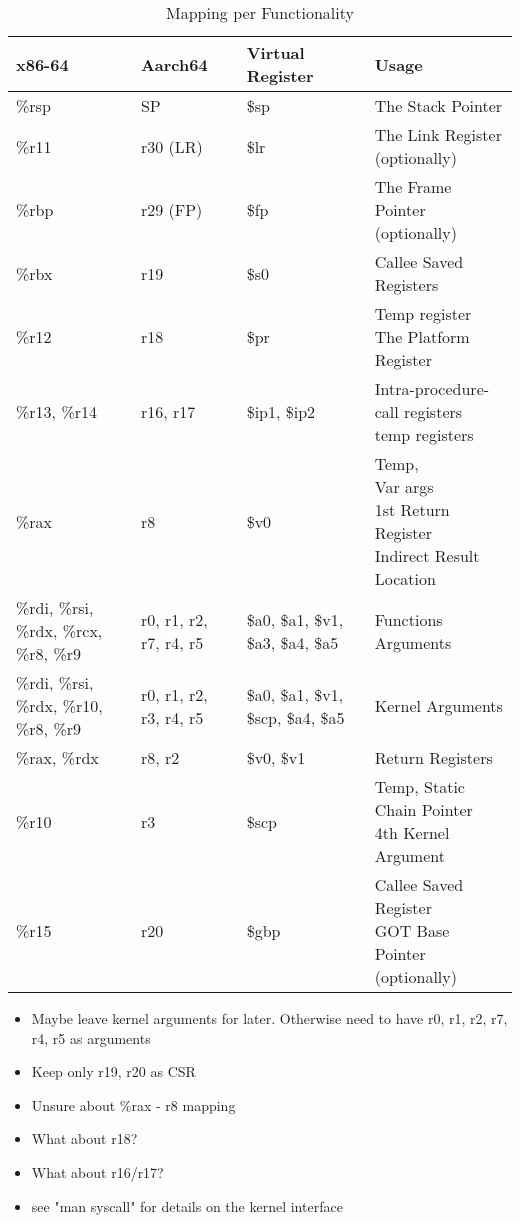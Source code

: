 \documentclass[11pt]{article}
\begin{document}
\begin{table}[ht]
\caption{Mapping per Functionality}
\begin{adjustwidth}{-4.3cm}{-4.3cm}
\begin{tabular}{|l|l|l|l|}
    \hline
    \textbf{x86-64} & \textbf{Aarch64} & \textbf{Virtual Register} & \textbf{Usage} \\
    \hline
    \%rsp & SP & \$sp & The Stack Pointer \\
    \hline
    \%r11 & r30 (LR) & \$lr & The Link Register (optionally) \\
    \hline
    \%rbp & r29 (FP) & \$fp & The Frame Pointer (optionally) \\
    \hline
    \%rbx & r19 & \$s0 & Callee Saved Registers \\
    \hline
    \%r12 & r18 & \$pr & \pbox{20cm}{Temp register \\ The Platform Register} \\
    \hline
    \%r13, \%r14 & r16, r17 & \$ip1, \$ip2 & \pbox{20cm}{Intra-procedure-call registers \\ temp registers} \\
    \hline
    \%rax & r8 & \$v0 & \pbox{20cm}{Temp, \\  Var args \\ 1st Return Register \\ Indirect Result Location} \\
    \hline
    \%rdi, \%rsi, \%rdx, \%rcx, \%r8, \%r9 & r0, r1, r2, r7, r4, r5 & \$a0, \$a1, \$v1, \$a3, \$a4, \$a5 & Functions Arguments \\
    \hline
    \%rdi, \%rsi, \%rdx, \%r10, \%r8, \%r9 & r0, r1, r2, r3, r4, r5 & \$a0, \$a1, \$v1, \$scp, \$a4, \$a5 & Kernel Arguments \\
    \hline
    \%rax, \%rdx & r8, r2 & \$v0, \$v1 & Return Registers \\
    \hline
    \%r10 & r3 & \$scp & \pbox{20cm}{Temp, Static Chain Pointer \\ 4th Kernel Argument} \\
    \hline
    \%r15 & r20 & \$gbp & \pbox{20cm}{Callee Saved Register \\ GOT Base Pointer (optionally)} \\
    \hline
\end{tabular}
\end{adjustwidth}\label{tab:mappings_per_func}
\end{table}

    \begin{itemize}
        \item Maybe leave kernel arguments for later.
        Otherwise need to have r0, r1, r2, r7, r4, r5 as arguments
        \item Keep only r19, r20 as CSR
        \item Unsure about \%rax - r8 mapping
        \item What about r18?
        \item What about r16/r17?
        \item see "man syscall" for details on the kernel interface
    \end{itemize}
\end{document}
